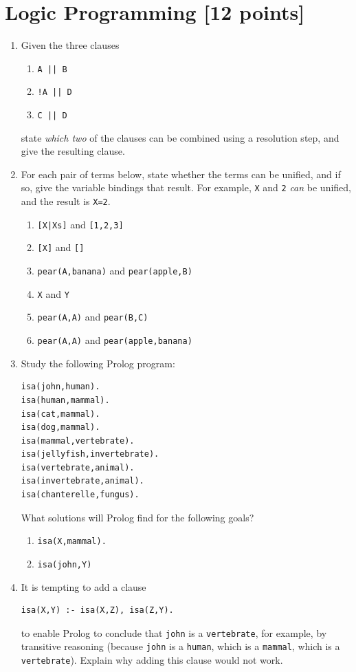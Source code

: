 \documentclass{article}
\begin{document}
\newpage
\section{Logic Programming [12 points]}

\begin{enumerate}
\item
Given the three clauses
\begin{enumerate}
\item \verb!A || B!
\item \verb?!A || D?
\item \verb!C || D!
\end{enumerate}
state {\em which two} of the clauses can be combined using a resolution step, and give the resulting clause.

\item
For each pair of terms below, state whether the terms can be unified,
and if so, give the variable bindings that result. For example,
\verb!X! and \verb!2! {\em can} be unified, and the result is
\verb!X=2!.
\begin{enumerate}
\item \verb![X|Xs]! and \verb![1,2,3]!
\item \verb![X]! and \verb![]!
\item \verb!pear(A,banana)! and \verb!pear(apple,B)!
\item \verb!X! and \verb!Y!
\item \verb!pear(A,A)! and \verb!pear(B,C)!
\item \verb!pear(A,A)! and \verb!pear(apple,banana)!
\end{enumerate}

\item
Study the following Prolog program:
\begin{verbatim}
isa(john,human).
isa(human,mammal).
isa(cat,mammal).
isa(dog,mammal).
isa(mammal,vertebrate).
isa(jellyfish,invertebrate).
isa(vertebrate,animal).
isa(invertebrate,animal).
isa(chanterelle,fungus).
\end{verbatim}
What solutions will Prolog find for the following goals?
\begin{enumerate}
\item
\verb!isa(X,mammal).!
\item
\verb!isa(john,Y)!
\end{enumerate}

\item
It is tempting to add a clause
\begin{verbatim}
isa(X,Y) :- isa(X,Z), isa(Z,Y).
\end{verbatim}
to enable Prolog to conclude that \verb!john! is a \verb!vertebrate!,
for example, by transitive reasoning (because \verb!john! is a
\verb!human!, which is a \verb!mammal!, which is a
\verb!vertebrate!). Explain why adding this clause would not work.


\end{enumerate}
\end{document}

